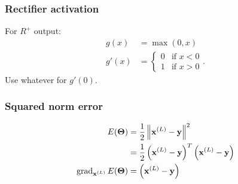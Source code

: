 \subsubsection{Rectifier activation}
For $R^+$ output:
\begin{align}
    g(x)    &= \max(0, x) \\
    g'(x)   &=
        \begin{cases}
            0 & \text{if } x < 0 \\
            1 & \text{if } x > 0
        \end{cases}.
\end{align}
Use whatever for $g'(0)$.

\subsubsection{Squared norm error}
\begin{align}
    E(\boldsymbol{\mathbf{\Theta}})  &= \frac{1}{2}\left\|\boldsymbol{\mathbf{x}}^{(L)} - \boldsymbol{\mathbf{y}} \right\|^2 \\
                    &= \frac{1}{2}\left(\boldsymbol{\mathbf{x}}^{(L)} - \boldsymbol{\mathbf{y}}\right)^T \left(\boldsymbol{\mathbf{x}}^{(L)} - \boldsymbol{\mathbf{y}}\right) \\
    \operatorname{\mathrm{grad}}_{\boldsymbol{\mathbf{x}}^{(L)}} E(\boldsymbol{\mathbf{\Theta}}) &= \left(\boldsymbol{\mathbf{x}}^{(L)} - \boldsymbol{\mathbf{y}}\right)
\end{align}

